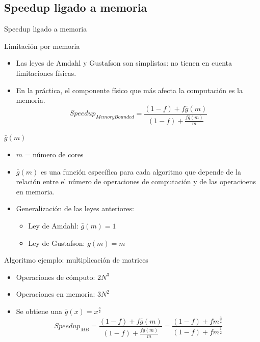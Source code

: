 \documentclass[utf8]{beamer}
\begin{document}
\subsection*{Speedup ligado a memoria}

\begin{frame}[allowframebreaks]{Speedup ligado a memoria}
    \begin{block}{Limitación por memoria}
        \begin{itemize}
        \item Las leyes de Amdahl y Gustafson son simplistas: no tienen en cuenta limitaciones físicas.
        \item En la práctica, el componente físico que más afecta la computación es la memoria.
        $$ Speedup_{MemoryBounded} = \frac{(1-f) + f \bar{g}(m)}{(1-f) + \frac{f\bar{g}(m)}{m}} $$
        \end{itemize}
    \end{block}
    \begin{block}{$\bar{g}(m)$}
        \begin{itemize}
	    \item $m$ = número de cores
            \item $\bar{g}(m)$ es una función específica para cada algoritmo que depende de la relación entre el número de operaciones de computación y de las operacioens en memoria.
            \item Generalización de las leyes anteriores:
            \begin{itemize}
                \item Ley de Amdahl: $\bar{g}(m) = 1$
                \item Ley de Gustafson: $\bar{g}(m) = m$
            \end{itemize}
        \end{itemize}
    \end{block}
    \begin{block}{Algoritmo ejemplo: multiplicación de matrices}
        \begin{itemize}
            \item Operaciones de cómputo: $2N^3$
            \item Operaciones en memoria: $3N^2$
            \item Se obtiene una $\bar{g}(x) = x^\frac{3}{2}$
            $$ Speedup_{MB} = \frac{(1-f) + f \bar{g}(m)}{(1-f) + \frac{f\bar{g}(m)}{m}} = \frac{(1-f) + f m^\frac{3}{2}}{(1-f) + fm^\frac{1}{2}} $$
        \end{itemize}

\end{block}
\end{frame}
\end{document}
